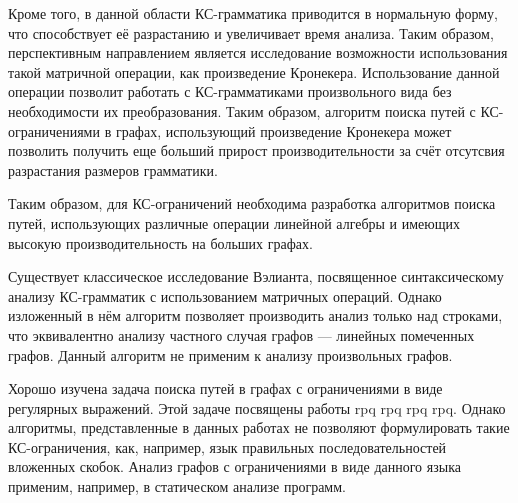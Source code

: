 Кроме того, в данной области КС-грамматика приводится в нормальную форму, что способствует её разрастанию и увеличивает время анализа. Таким образом, перспективным направлением является исследование возможности использования такой матричной операции, как произведение Кронекера. Использование данной операции позволит работать с КС-грамматиками произвольного вида без необходимости их преобразования. Таким образом, алгоритм поиска путей с КС-ограничениями в графах, использующий произведение Кронекера может позволить получить еще больший прирост производительности за счёт отсутсвия разрастания размеров грамматики.

Таким образом, для КС-ограничений необходима разработка алгоритмов поиска путей, использующих различные операции линейной алгебры и имеющих высокую производительность на больших графах.




{\progress}
Существует классическое исследование Вэлианта, посвященное синтаксическому анализу КС-грамматик с использованием матричных операций. Однако изложенный в нём алгоритм позволяет производить анализ только над строками, что эквивалентно анализу частного случая графов --- линейных помеченных графов. Данный алгоритм не применим к анализу произвольных графов.

Хорошо изучена задача поиска путей в графах с ограничениями в виде регулярных выражений. Этой задаче посвящены работы rpq rpq rpq rpq. Однако алгоритмы, представленные в данных работах не позволяют формулировать такие КС-ограничения, как, например, язык правильных последовательностей вложенных скобок. Анализ графов с ограничениями в виде данного языка применим, например, в статическом анализе программ.

